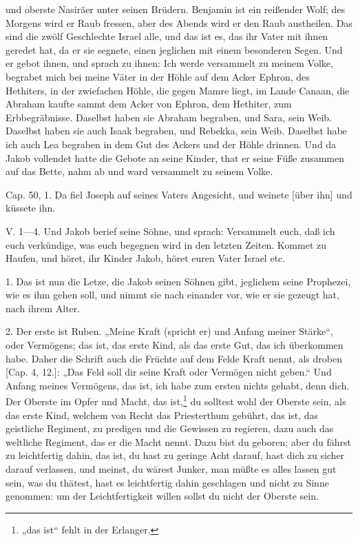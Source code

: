 \begin{schriftzitat}
und oberste Nasiräer unter seinen Brüdern. Benjamin ist ein reißender Wolf; des Morgens wird er Raub fressen, aber des Abends wird er den Raub austheilen. Das sind die zwölf Geschlechte Israel alle, und das ist es, das ihr Vater mit ihnen geredet hat, da er sie segnete, einen jeglichen mit einem besonderen Segen. Und er gebot ihnen, und sprach zu ihnen: Ich werde versammelt zu meinem Volke, begrabet mich bei meine Väter in der Höhle auf dem Acker Ephron, des Hethiters, in der zwiefachen Höhle, die gegen Mamre liegt, im Lande Canaan, die Abraham kaufte sammt dem Acker von Ephron, dem Hethiter, zum Erbbegräbnisse. Daselbst haben sie Abraham begraben, und Sara, sein Weib. Daselbst haben sie auch Isaak begraben, und Rebekka, sein Weib. Daselbst habe ich auch Lea begraben in dem Gut des Ackers und der Höhle drinnen. Und da Jakob vollendet hatte die Gebote an seine Kinder, that er seine Füße zusammen auf das Bette, nahm ab und ward versammelt zu seinem Volke.

Cap. 50, 1. Da fiel Joseph auf seines Vaters Angesicht, und weinete [über ihn] und küssete ihn.

V. 1—4. Und Jakob berief seine Söhne, und sprach: Versammelt euch, daß ich euch verkündige, was euch begegnen wird in den letzten Zeiten. Kommet zu Haufen, und höret, ihr Kinder Jakob, höret euren Vater Israel etc.
\end{schriftzitat}

1. Das ist nun die Letze, die Jakob seinen Söhnen gibt, jeglichem seine Prophezei, wie es ihm gehen soll, und nimmt sie nach einander vor, wie er sie gezeugt hat, nach ihrem Alter.

2. Der erste ist Ruben. „Meine Kraft (spricht er) und Anfang meiner Stärke“, oder Vermögens; das ist, das erste Kind, als das erste Gut, das ich überkommen habe. Daher die
Schrift auch die Früchte auf dem Felde Kraft nennt, als droben [Cap. 4, 12.]: „Das Feld soll dir seine Kraft oder Vermögen nicht geben.“ Und Anfang meines Vermögens, das ist, ich habe zum ersten nichts gehabt, denn dich. Der Oberste im Opfer und Macht, das ist,\footnote{„das ist“ fehlt in der Erlanger.} du solltest wohl der Oberste sein, als das erste Kind, welchem von Recht das Priesterthum gebührt, das ist, das geistliche Regiment, zu predigen und die Gewissen zu regieren, dazu auch das weltliche Regiment, das er die Macht nennt. Dazu bist du geboren; aber du fährst zu leichtfertig dahin, das ist, du hast zu geringe Acht darauf, hast dich zu sicher darauf verlassen, und meinst, du wärest Junker, man müßte es alles lassen gut sein, was du thätest, hast es leichtfertig dahin geschlagen und nicht zu Sinne genommen: um der Leichtfertigkeit willen sollst du nicht der Oberste sein.

